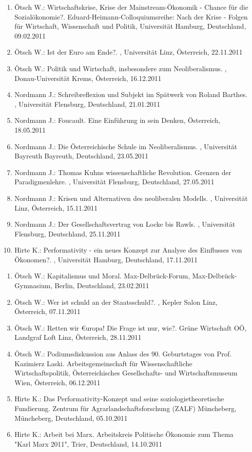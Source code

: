 \begin{enumerate}
	\item Ötsch W.: Wirtschaftskrise, Krise der Mainstream-Ökonomik - Chance für die Sozialökonomie?. Eduard-Heimann-Colloquiumsreihe: Nach der Krise - Folgen für Wirtschaft, Wissenschaft und Politik, Universität Hamburg, Deutschland, 09.02.2011
	\item Ötsch W.: Ist der Euro am Ende?. , Universität Linz, Österreich, 22.11.2011
	\item Ötsch W.: Politik und Wirtschaft, insbesondere zum Neoliberalismus. , Donau-Universität Krems, Österreich, 16.12.2011
	\item Nordmann J.: Schreibreflexion und Subjekt im Spätwerk von Roland Barthes. , Universität Flensburg, Deutschland, 21.01.2011
	\item Nordmann J.: Foucault. Eine Einführung in sein Denken, Österreich, 18.05.2011
	\item Nordmann J.: Die Österreichische Schule im Neoliberalismus. , Universität Bayreuth Bayreuth, Deutschland, 23.05.2011
	\item Nordmann J.: Thomas Kuhns wissenschaftliche Revolution. Grenzen der Paradigmenlehre. , Universität Flensburg, Deutschland, 27.05.2011
	\item Nordmann J.: Krisen und Alternativen des neoliberalen Modells. , Universität Linz, Österreich, 15.11.2011
	\item Nordmann J.: Der Gesellschaftsvertrag von Locke bis Rawls. , Universität Flensburg, Deutschland, 25.11.2011
	\item Hirte K.: Performativity - ein neues Konzept zur Analyse des Einflusses von Ökonomen?. , Universität Hamburg, Deutschland, 17.11.2011
\end{enumerate}

\begin{enumerate}
	\item Ötsch W.: Kapitalismus und Moral. Max-Delbrück-Forum, Max-Delbrück-Gymnasium, Berlin, Deutschland, 23.02.2011
	\item Ötsch W.: Wer ist schuld an der Staatsschuld?. , Kepler Salon Linz, Österreich, 07.11.2011
	\item Ötsch W.: Retten wir €uropa! Die Frage ist nur, wie?. Grüne Wirtschaft OÖ, Landgraf Loft Linz, Österreich, 28.11.2011
	\item Ötsch W.: Podiumsdiskussion aus Anlass des 90. Geburtstages von Prof. Kazimierz Laski. Arbeitsgemeinschaft für Wissenschaftliche Wirtschaftspolitik, Österreichisches Gesellschafts- und Wirtschaftsmuseum Wien, Österreich, 06.12.2011
	\item Hirte K.: Das Performativity-Konzept und seine soziologietheoretische Fundierung. Zentrum für Agrarlandschaftsforschung (ZALF) Müncheberg, Müncheberg, Deutschland, 05.10.2011
	\item Hirte K.: Arbeit bei Marx. Arbeitskreis Politische Ökonomie zum Thema "Karl Marx 2011", Trier, Deutschland, 14.10.2011
\end{enumerate}

